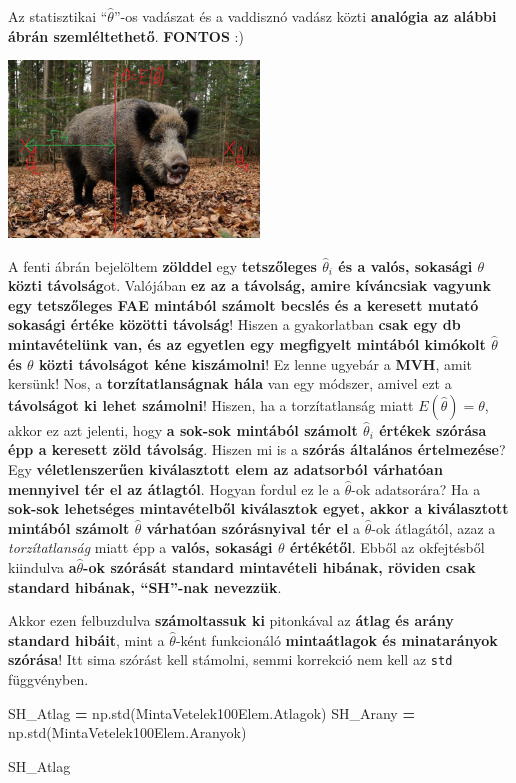 \documentclass[
]{book}
\newenvironment{Shaded}{\begin{snugshade}}{\end{snugshade}}
\newcommand{\NormalTok}[1]{#1}
\newcommand{\OperatorTok}[1]{\textcolor[rgb]{0.81,0.36,0.00}{\textbf{#1}}}
\begin{document}
Az statisztikai ``\(\hat{\theta}\)''-os vadászat és a vaddisznó vadász közti \textbf{analógia az alábbi ábrán szemléltethető}. \textbf{FONTOS} :)

\includegraphics[width=0.5\textwidth,height=\textheight]{BiasBoar.jpg}

A fenti ábrán bejelöltem \textbf{zölddel} egy \textbf{tetszőleges \(\hat{\theta}_i\) és a valós, sokasági \(\theta\) közti távolság}ot. Valójában \textbf{ez az a távolság, amire kíváncsiak vagyunk egy tetszőleges FAE mintából számolt becslés és a keresett mutató sokasági értéke közötti távolság}! Hiszen a gyakorlatban \textbf{csak egy db mintavételünk van, és az egyetlen egy megfigyelt mintából kimókolt \(\hat{\theta}\) és \(\theta\) közti távolságot kéne kiszámolni}! Ez lenne ugyebár a \textbf{MVH}, amit kersünk!
Nos, a \textbf{torzítatlanságnak hála} van egy módszer, amivel ezt a \textbf{távolságot ki lehet számolni}! Hiszen, ha a torzítatlanság miatt \(E(\hat{\theta})=\theta\), akkor ez azt jelenti, hogy \textbf{a sok-sok mintából számolt \(\hat{\theta}_i\) értékek szórása épp a keresett zöld távolság}. Hiszen mi is a \textbf{szórás általános értelmezése}? Egy \textbf{véletlenszerűen kiválasztott elem az adatsorból várhatóan mennyivel tér el az átlagtól}. Hogyan fordul ez le a \(\hat{\theta}\)-ok adatsorára? Ha a \textbf{sok-sok lehetséges mintavételből kiválasztok egyet, akkor a kiválasztott mintából számolt \(\hat{\theta}\) várhatóan szórásnyival tér el} a \(\hat{\theta}\)-ok átlagától, azaz a \emph{torzítatlanság} miatt épp a \textbf{valós, sokasági \(\theta\) értékétől}.
Ebből az okfejtésből kiindulva \textbf{a\(\hat{\theta}\)-ok szórását standard mintavételi hibának, röviden csak standard hibának, ``SH''-nak nevezzük}.

Akkor ezen felbuzdulva \textbf{számoltassuk ki} pitonkával az \textbf{átlag és arány standard hibáit}, mint a \(\hat{\theta}\)-ként funkcionáló \textbf{mintaátlagok és minatarányok szórása}! Itt sima szórást kell stámolni, semmi korrekció nem kell az \texttt{std} függvényben.

\begin{Shaded}
\begin{Highlighting}[]
\NormalTok{SH\_Atlag }\OperatorTok{=}\NormalTok{ np.std(MintaVetelek100Elem.Atlagok)}
\NormalTok{SH\_Arany }\OperatorTok{=}\NormalTok{ np.std(MintaVetelek100Elem.Aranyok)}

\NormalTok{SH\_Atlag}
\end{Highlighting}
\end{Shaded}
\end{document}
